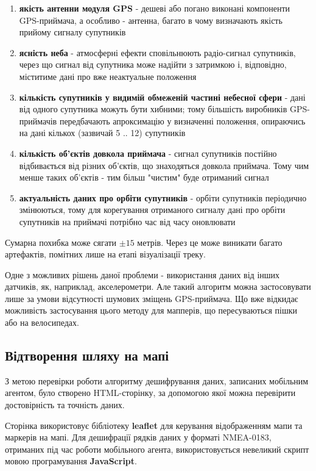 \documentclass[simple,a4paper,14pt,ukrainian,utf8]{eskdtext}
\begin{document}
	\begin{enumerate}
		\item \textbf{якість антенни модуля GPS} - дешеві або погано виконані компоненти GPS-приймача, а особливо - антенна, багато в чому визначають якість прийому сигналу супутників
		\item \textbf{ясність неба} - атмосферні ефекти сповільнюють радіо-сигнал супутників, через що сигнал від супутника може надійти з затримкою і, відповідно, міститиме дані про вже неактуальне положення
		\item \textbf{кількість супутників у видимій обмеженій частині небесної сфери} - дані від одного супутника можуть бути хибними; тому більшість виробників GPS-приймачів передбачають апроксимацію у визначенні положення, опираючись на дані кількох (зазвичай 5 .. 12) супутників
		\item \textbf{кількість об’єктів довкола приймача}	 - сигнал супутників постійно відбивається від різних об’єктів, що знаходяться довкола приймача. Тому чим менше таких об’єктів - тим більш "чистим" буде отриманий сигнал
		\item \textbf{актуальність даних про орбіти супутників} - орбіти супутників періодично змінюються, тому для корегування отриманого сигналу дані про орбіти супутників на приймачі потрібно час від часу оновлювати
	\end{enumerate}
	
	Сумарна похибка може сягати $\pm 15$ метрів. Через це може виникати багато артефактів, помітних лише на етапі візуалізації треку.
	
	Одне з можливих рішень даної проблеми - використання даних від інших датчиків, як, наприклад, акселерометри. Але такий алгоритм можна застосовувати лише за умови відсутності шумових зміщень GPS-приймача. Що вже відкидає можливість застосування цього методу для мапперів, що пересуваються пішки або на велосипедах.
	
    \subsection{Відтворення шляху на мапі}
    
    З метою перевірки роботи алгоритму дешифрування даних, записаних мобільним агентом, було створено HTML-сторінку, за допомогою якої можна перевірити достовірність та точність даних.
    
    Сторінка використовує бібліотеку \textbf{leaflet} для керування відображенням мапи та маркерів на мапі. Для дешифрації рядків даних у форматі NMEA-0183, отриманих під час роботи мобільного агента, використовується невеликий скрипт мовою програмування \textbf{JavaScript}.
    
\end{document}
